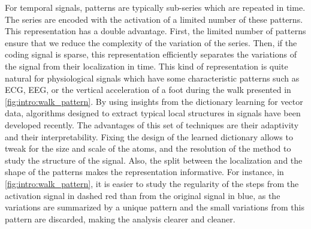 \documentclass[../thesis.tex]{subfiles}
\begin{document}
For temporal signals, patterns are typically sub-series which are repeated in time. The series are encoded with the activation of a limited number of these patterns. This representation has a double advantage. First, the limited number of patterns ensure that we reduce the complexity of the variation of the series. Then, if the coding signal is sparse, this representation efficiently separates the variations of the signal from their localization in time. This kind of representation is quite natural for physiological signals which have some characteristic patterns such as ECG, EEG,  or the vertical acceleration of a foot during the walk presented in \autoref{fig:intro:walk_pattern}. By using insights from the dictionary learning for vector data, algorithms designed to extract typical local structures in signals have been developed recently. The advantages of this set of techniques are their adaptivity and their interpretability. Fixing the design of the learned dictionary allows to tweak for the size and scale of the atoms, and the resolution of the method to study the structure of the signal. Also, the split between the localization and the shape of the patterns makes the representation informative. For instance, in \autoref{fig:intro:walk_pattern}, it is easier to study the regularity of the steps from the activation signal in dashed red than from the original signal in blue, as the variations are summarized by a unique pattern and the small variations from this pattern are discarded, making the analysis clearer and cleaner.







\biblio{}
\end{document}
